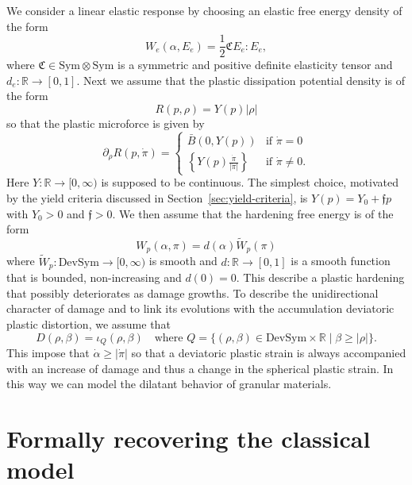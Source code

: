 \documentclass[a4paper,10pt,oneside]{amsbook}
\numberwithin{section}{chapter}
\numberwithin{equation}{chapter}
\theoremstyle{definition}
\begin{document}
We consider a linear elastic response by choosing an elastic free energy density of the form
\[
W_e(\alpha,E_e)=\frac{1}{2}\mathfrak{C}E_e:E_e,
\]
where $\mathfrak{C}\in\text{Sym}\otimes\text{Sym}$ is a symmetric and positive definite elasticity tensor and $d_e\colon\mathbb{R}\to[0,1]$. Next we assume that the plastic dissipation potential density is of the form
\[
R(p,\rho)=Y(p)|\rho|
\]
so that the plastic microforce is given by
\[
\partial_\rho R(p,\dot\pi)=\begin{cases}
\bar B(0,Y(p)) & \text{if $\dot\pi=0$} \\
\left\{Y(p)\frac{\dot\pi}{|\dot\pi|}\right\} & \text{if $\dot\pi\neq0$}.
\end{cases}
\]
Here $Y\colon\mathbb{R}\to[0,\infty)$ is supposed to be continuous. The simplest choice, motivated by the yield criteria discussed in Section~\ref{sec:yield-criteria}, is $Y(p)=Y_0+\mathfrak{f}p$ with $Y_0>0$ and $\mathfrak{f}>0$. We then assume that the hardening free energy is of the form
\[
W_p(\alpha,\pi)=d(\alpha)\tilde W_p(\pi)
\]
where $\tilde W_p\colon\text{DevSym}\to[0,\infty)$ is smooth and $d\colon\mathbb{R}\to[0,1]$ is a smooth function that is bounded, non-increasing and $d(0)=0$. This describe a plastic hardening that possibly deteriorates as damage growths. To describe the unidirectional character of damage and to link its evolutions with the accumulation deviatoric plastic distortion, we assume that
\[
D(\rho,\beta)=\iota_Q(\rho,\beta)\quad\text{where $Q=\{(\rho,\beta)\in\text{DevSym}\times\mathbb{R}\;|\;\beta\ge|\rho|\}$}.
\]
This impose that $\dot\alpha\ge|\dot\pi|$ so that a deviatoric plastic strain is always accompanied with an increase of damage and thus a change in the spherical plastic strain. In this way we can model the dilatant behavior of granular materials.

\section{Formally recovering the classical model}
\label{sec:recovering}
\end{document}

